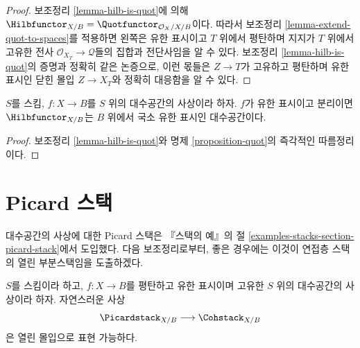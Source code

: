 \begin{proof}
보조정리 \ref{lemma-hilb-is-quot}에 의해
$\Hilbfunctor_{X/B} = \Quotfunctor_{\mathcal{O}_X/X/B}$이다.
따라서 보조정리 \ref{lemma-extend-quot-to-spaces}를 적용하면 왼쪽은
유한 표시이고 $T$ 위에서 평탄하며 지지가 $T$ 위에서 고유한 전사
$\mathcal{O}_{X_T} \to \mathcal{Q}$들의 집합과 전단사임을 알 수 있다.
보조정리 \ref{lemma-hilb-is-quot}의 증명과 정확히 같은 논증으로,
이런 몫들은 $Z \to T$가 고유하고 평탄하며 유한 표시인 닫힌 몰입
$Z \to X_T$와 정확히 대응함을 알 수 있다.
\end{proof}

\begin{proposition}
\label{proposition-hilb}
$S$를 스킴, $f : X \to B$를 $S$ 위의 대수공간의 사상이라 하자.
$f$가 유한 표시이고 분리이면 $\Hilbfunctor_{X/B}$는
$B$ 위에서 국소 유한 표시인 대수공간이다.
\end{proposition}

\begin{proof}
보조정리 \ref{lemma-hilb-is-quot}와 명제 \ref{proposition-quot}의
즉각적인 따름정리이다.
\end{proof}






\section{Picard 스택}
\label{section-picard-stack}

\noindent
대수공간의 사상에 대한 Picard 스택은 『스택의 예』의 절
\ref{examples-stacks-section-picard-stack}에서 도입했다.
다음 보조정리로부터, 좋은 경우에는 이것이 연접층 스택의 열린
부분스택임을 도출하겠다.

\begin{lemma}
\label{lemma-picard-stack-open-in-coh}
$S$를 스킴이라 하고, $f : X \to B$를 평탄하고 유한 표시이며 고유한
$S$ 위의 대수공간의 사상이라 하자. 자연스러운 사상
$$
\Picardstack_{X/B} \longrightarrow \Cohstack_{X/B}
$$
은 열린 몰입으로 표현 가능하다.
\end{lemma}

